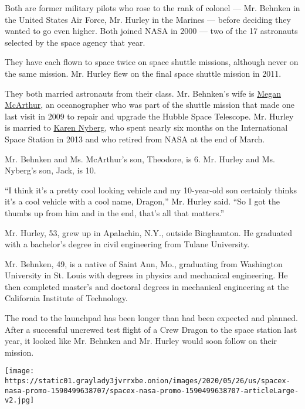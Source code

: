 Both are former military pilots who rose to the rank of colonel --- Mr.
Behnken in the United States Air Force, Mr. Hurley in the Marines ---
before deciding they wanted to go even higher. Both joined NASA in 2000
--- two of the 17 astronauts selected by the space agency that year.

They have each flown to space twice on space shuttle missions, although
never on the same mission. Mr. Hurley flew on the final space shuttle
mission in 2011.

They both married astronauts from their class. Mr. Behnken's wife is
\href{https://www.nasa.gov/astronauts/biographies/k-megan-mcarthur/biography}{Megan
McArthur}, an oceanographer who was part of the shuttle mission that
made one last visit in 2009 to repair and upgrade the Hubble Space
Telescope. Mr. Hurley is married to
\href{https://www.nasa.gov/astronauts/biographies/karen-l-nyberg/biography}{Karen
Nyberg}, who spent nearly six months on the International Space Station
in 2013 and who retired from NASA at the end of March.

Mr. Behnken and Ms. McArthur's son, Theodore, is 6. Mr. Hurley and Ms.
Nyberg's son, Jack, is 10.

``I think it's a pretty cool looking vehicle and my 10-year-old son
certainly thinks it's a cool vehicle with a cool name, Dragon,'' Mr.
Hurley said. ``So I got the thumbs up from him and in the end, that's
all that matters.''

Mr. Hurley, 53, grew up in Apalachin, N.Y., outside Binghamton. He
graduated with a bachelor's degree in civil engineering from Tulane
University.

Mr. Behnken, 49, is a native of Saint Ann, Mo., graduating from
Washington University in St. Louis with degrees in physics and
mechanical engineering. He then completed master's and doctoral degrees
in mechanical engineering at the California Institute of Technology.

The road to the launchpad has been longer than had been expected and
planned. After a successful uncrewed test flight of a Crew Dragon to the
space station last year, it looked like Mr. Behnken and Mr. Hurley would
soon follow on their mission.

\href{https://www.nytimes3xbfgragh.onion/interactive/2020/05/26/science/spacex-nasa.html}{}

\texttt{[image: https://static01.graylady3jvrrxbe.onion/images/2020/05/26/us/spacex-nasa-promo-1590499638707/spacex-nasa-promo-1590499638707-articleLarge-v2.jpg]}

